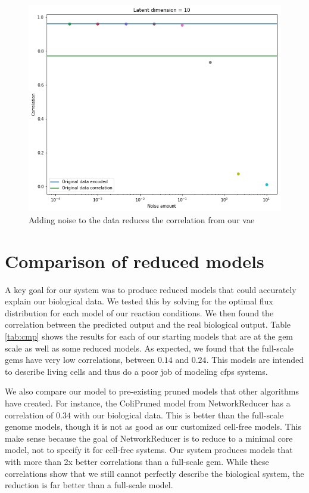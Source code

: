 \begin{figure}[t!]
\begin{center}
\includegraphics[width=1.01\textwidth]{figs/Noise_add.png}
\caption[Noise added to input data reduces the efficacy of a Corr-VAE]{Adding noise to the data reduces the correlation from our \gls{vae}}
\label{fig:noise}
\end{center}
\end{figure}

\section{Comparison of reduced models}\label{sec:cmp}
A key goal for our system was to produce reduced models that could accurately explain our biological data.
We tested this by solving for the optimal flux distribution for each model of our reaction conditions.
We then found the correlation between the predicted output and the real biological output.
Table \ref{tab:cmp} shows the results for each of our starting models that are at the \gls{gem} scale as well as some reduced models.
As expected, we found that the full-scale \glspl{gem} have very low correlations, between $0.14$ and $0.24$.
This models are intended to describe living \ecoli cells and thus do a poor job of modeling \gls{cfps} systems.

We also compare our model to pre-existing pruned models that other algorithms have created.
For instance, the ColiPruned model from NetworkReducer has a correlation of $0.34$ with our biological data.
This is better than the full-scale genome models, though it is not as good as our customized cell-free models.
This make sense because the goal of NetworkReducer is to reduce to a minimal core model, not to specify it for cell-free systems.
Our system produces models that with more than 2x better correlations than a full-scale \gls{gem}.
While these correlations show that we still cannot perfectly describe the biological system, the reduction is far better than a full-scale model.

